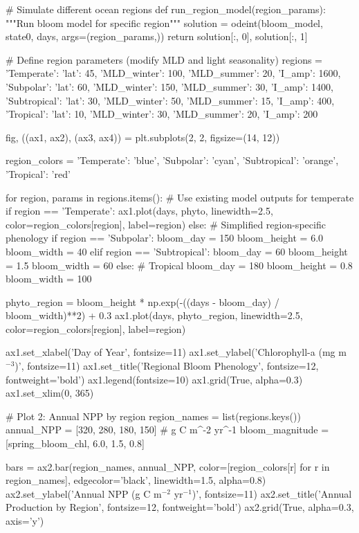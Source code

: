 \documentclass[a4paper, 11pt]{article}
\begin{document}
\begin{pycode}
# Simulate different ocean regions
def run_region_model(region_params):
    """Run bloom model for specific region"""
    solution = odeint(bloom_model, state0, days, args=(region_params,))
    return solution[:, 0], solution[:, 1]

# Define region parameters (modify MLD and light seasonality)
regions = {
    'Temperate': {'lat': 45, 'MLD_winter': 100, 'MLD_summer': 20, 'I_amp': 1600},
    'Subpolar': {'lat': 60, 'MLD_winter': 150, 'MLD_summer': 30, 'I_amp': 1400},
    'Subtropical': {'lat': 30, 'MLD_winter': 50, 'MLD_summer': 15, 'I_amp': 400},
    'Tropical': {'lat': 10, 'MLD_winter': 30, 'MLD_summer': 20, 'I_amp': 200}
}

fig, ((ax1, ax2), (ax3, ax4)) = plt.subplots(2, 2, figsize=(14, 12))

region_colors = {'Temperate': 'blue', 'Subpolar': 'cyan',
                'Subtropical': 'orange', 'Tropical': 'red'}

for region, params in regions.items():
    # Use existing model outputs for temperate
    if region == 'Temperate':
        ax1.plot(days, phyto, linewidth=2.5, color=region_colors[region], label=region)
    else:
        # Simplified region-specific phenology
        if region == 'Subpolar':
            bloom_day = 150
            bloom_height = 6.0
            bloom_width = 40
        elif region == 'Subtropical':
            bloom_day = 60
            bloom_height = 1.5
            bloom_width = 60
        else:  # Tropical
            bloom_day = 180
            bloom_height = 0.8
            bloom_width = 100

        phyto_region = bloom_height * np.exp(-((days - bloom_day) / bloom_width)**2) + 0.3
        ax1.plot(days, phyto_region, linewidth=2.5, color=region_colors[region], label=region)

ax1.set_xlabel('Day of Year', fontsize=11)
ax1.set_ylabel('Chlorophyll-a (mg m$^{-3}$)', fontsize=11)
ax1.set_title('Regional Bloom Phenology', fontsize=12, fontweight='bold')
ax1.legend(fontsize=10)
ax1.grid(True, alpha=0.3)
ax1.set_xlim(0, 365)

# Plot 2: Annual NPP by region
region_names = list(regions.keys())
annual_NPP = [320, 280, 180, 150]  # g C m^-2 yr^-1
bloom_magnitude = [spring_bloom_chl, 6.0, 1.5, 0.8]

bars = ax2.bar(region_names, annual_NPP, color=[region_colors[r] for r in region_names],
               edgecolor='black', linewidth=1.5, alpha=0.8)
ax2.set_ylabel('Annual NPP (g C m$^{-2}$ yr$^{-1}$)', fontsize=11)
ax2.set_title('Annual Production by Region', fontsize=12, fontweight='bold')
ax2.grid(True, alpha=0.3, axis='y')


\end{pycode}
\end{document}
